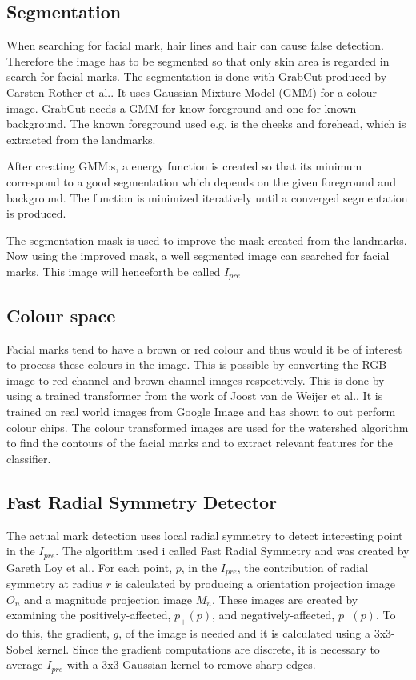 \subsection{Segmentation}

When searching for facial mark, hair lines and hair can cause false detection. Therefore the image has to be segmented so that only skin area is regarded in search for facial marks. The segmentation is done with GrabCut produced by Carsten Rother et al.\cite{grabcut}. It uses Gaussian Mixture Model (GMM) for a colour image. GrabCut needs a GMM for know foreground and one for known background. The known foreground used e.g. is the cheeks and forehead, which is extracted from the landmarks. 

After creating GMM:s, a energy function is created so that its minimum correspond to a good segmentation which depends on the given foreground and background. The function is minimized iteratively until a converged segmentation is produced.

The segmentation mask is used to improve the mask created from the landmarks. Now using the improved mask, a well segmented image can searched for facial marks. This image will henceforth be called \textit{$I_{pre}$}

\subsection{Colour space}

Facial marks tend to have a brown or red colour and thus would it be of interest to process these colours in the image. This is possible by converting the RGB image to red-channel and brown-channel images respectively. This is done by using a trained transformer from the work of Joost van de Weijer et al.\cite{11_colours}. It is trained on real world images from Google Image and has shown to out perform colour chips. The colour transformed images are used for the watershed algorithm to find the contours of the facial marks and to extract relevant features for the classifier. 


\subsection{Fast Radial Symmetry Detector}

The actual mark detection uses local radial symmetry to detect interesting point in the \textit{$I_{pre}$}. The algorithm used i called Fast Radial Symmetry and was created by Gareth Loy et al.\cite{FRS}. For each point, $p$, in the \textit{$I_{pre}$}, the contribution of radial symmetry at radius $r$ is calculated by producing a orientation projection image $O_n$ and a magnitude projection image $M_n$. These images are created by examining the positively-affected, $p_{+}(p)$, and negatively-affected, $p_{-}(p)$. To do this, the gradient, $g$, of the image is needed and it is calculated using a 3x3-Sobel kernel. Since the gradient computations are discrete, it is necessary to average \textit{$I_{pre}$} with a 3x3 Gaussian kernel to remove sharp edges. 

